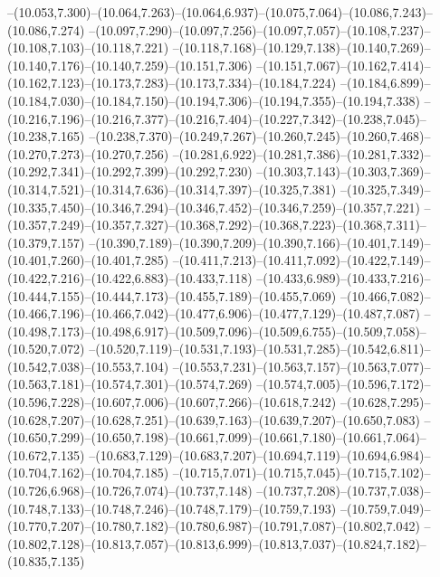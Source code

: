   --(10.053,7.300)--(10.064,7.263)--(10.064,6.937)--(10.075,7.064)--(10.086,7.243)--(10.086,7.274)%
  --(10.097,7.290)--(10.097,7.256)--(10.097,7.057)--(10.108,7.237)--(10.108,7.103)--(10.118,7.221)%
  --(10.118,7.168)--(10.129,7.138)--(10.140,7.269)--(10.140,7.176)--(10.140,7.259)--(10.151,7.306)%
  --(10.151,7.067)--(10.162,7.414)--(10.162,7.123)--(10.173,7.283)--(10.173,7.334)--(10.184,7.224)%
  --(10.184,6.899)--(10.184,7.030)--(10.184,7.150)--(10.194,7.306)--(10.194,7.355)--(10.194,7.338)%
  --(10.216,7.196)--(10.216,7.377)--(10.216,7.404)--(10.227,7.342)--(10.238,7.045)--(10.238,7.165)%
  --(10.238,7.370)--(10.249,7.267)--(10.260,7.245)--(10.260,7.468)--(10.270,7.273)--(10.270,7.256)%
  --(10.281,6.922)--(10.281,7.386)--(10.281,7.332)--(10.292,7.341)--(10.292,7.399)--(10.292,7.230)%
  --(10.303,7.143)--(10.303,7.369)--(10.314,7.521)--(10.314,7.636)--(10.314,7.397)--(10.325,7.381)%
  --(10.325,7.349)--(10.335,7.450)--(10.346,7.294)--(10.346,7.452)--(10.346,7.259)--(10.357,7.221)%
  --(10.357,7.249)--(10.357,7.327)--(10.368,7.292)--(10.368,7.223)--(10.368,7.311)--(10.379,7.157)%
  --(10.390,7.189)--(10.390,7.209)--(10.390,7.166)--(10.401,7.149)--(10.401,7.260)--(10.401,7.285)%
  --(10.411,7.213)--(10.411,7.092)--(10.422,7.149)--(10.422,7.216)--(10.422,6.883)--(10.433,7.118)%
  --(10.433,6.989)--(10.433,7.216)--(10.444,7.155)--(10.444,7.173)--(10.455,7.189)--(10.455,7.069)%
  --(10.466,7.082)--(10.466,7.196)--(10.466,7.042)--(10.477,6.906)--(10.477,7.129)--(10.487,7.087)%
  --(10.498,7.173)--(10.498,6.917)--(10.509,7.096)--(10.509,6.755)--(10.509,7.058)--(10.520,7.072)%
  --(10.520,7.119)--(10.531,7.193)--(10.531,7.285)--(10.542,6.811)--(10.542,7.038)--(10.553,7.104)%
  --(10.553,7.231)--(10.563,7.157)--(10.563,7.077)--(10.563,7.181)--(10.574,7.301)--(10.574,7.269)%
  --(10.574,7.005)--(10.596,7.172)--(10.596,7.228)--(10.607,7.006)--(10.607,7.266)--(10.618,7.242)%
  --(10.628,7.295)--(10.628,7.207)--(10.628,7.251)--(10.639,7.163)--(10.639,7.207)--(10.650,7.083)%
  --(10.650,7.299)--(10.650,7.198)--(10.661,7.099)--(10.661,7.180)--(10.661,7.064)--(10.672,7.135)%
  --(10.683,7.129)--(10.683,7.207)--(10.694,7.119)--(10.694,6.984)--(10.704,7.162)--(10.704,7.185)%
  --(10.715,7.071)--(10.715,7.045)--(10.715,7.102)--(10.726,6.968)--(10.726,7.074)--(10.737,7.148)%
  --(10.737,7.208)--(10.737,7.038)--(10.748,7.133)--(10.748,7.246)--(10.748,7.179)--(10.759,7.193)%
  --(10.759,7.049)--(10.770,7.207)--(10.780,7.182)--(10.780,6.987)--(10.791,7.087)--(10.802,7.042)%
  --(10.802,7.128)--(10.813,7.057)--(10.813,6.999)--(10.813,7.037)--(10.824,7.182)--(10.835,7.135)%
